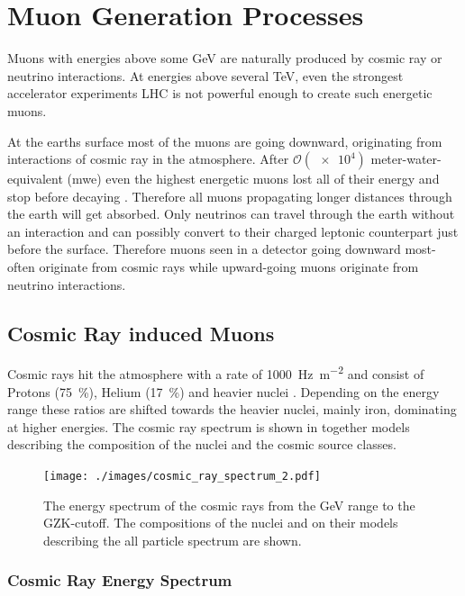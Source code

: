 \chapter{Muon Generation Processes}

Muons with energies above some GeV are naturally produced by cosmic ray or neutrino interactions.
At energies above several TeV, even the strongest accelerator experiments LHC is not powerful enough to create such energetic muons.

At the earths surface most of the muons are going downward, originating from interactions of cosmic ray in the atmosphere.
After $\mathcal{O}(\num{e4})$ meter-water-equivalent (mwe) even the highest energetic muons lost all of their energy and stop before decaying \cite{PDG20}.
Therefore all muons propagating longer distances through the earth will get absorbed.
Only neutrinos can travel through the earth without an interaction and can possibly convert to their charged leptonic counterpart just before the surface.
Therefore muons seen in a detector going downward most-often originate from cosmic rays while upward-going muons originate from neutrino interactions.

\section{Cosmic Ray induced Muons}

Cosmic rays hit the atmosphere with a rate of \SI{1000}{\hertz\per\square\meter} and consist of Protons (\SI{75}{\percent}), Helium (\SI{17}{\percent}) and heavier nuclei \cite{Gaisser16CR}.
Depending on the energy range these ratios are shifted towards the heavier nuclei, mainly iron, dominating at higher energies.
The cosmic ray spectrum is shown in  together models describing the composition of the nuclei and the cosmic source classes.

\begin{figure}
    \centering
    \texttt{[image: ./images/cosmic\_ray\_spectrum\_2.pdf]}
    \caption{The energy spectrum of the cosmic rays from the GeV range to the GZK-cutoff. The compositions of the nuclei and on their models describing the all particle spectrum are shown. \cite{Dembinski19MuonPuzzle}}
    \label{fig:cr_spectrum}
\end{figure}

\subsection{Cosmic Ray Energy Spectrum}

